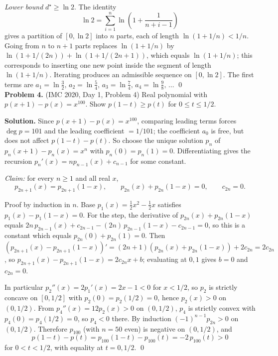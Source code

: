 \documentclass{article}
\begin{document}
\emph{Lower bound} \( d^{\star} \geq \ln 2 \). The identity
\[
\ln 2 = \sum_{i=1}^{n} \ln\!\left(1 + \frac{1}{n+i-1}\right)
\]
gives a partition of \( [0, \ln 2] \) into \( n \) parts, each of length \( \ln(1 + 1/n) < 1/n \). Going from \( n \) to \( n + 1 \) parts replaces \( \ln(1 + 1/n) \) by \( \ln(1 + 1/(2n)) + \ln(1 + 1/(2n+1)) \), which equals \( \ln(1 + 1/n) \); this corresponds to inserting one new point inside the segment of length \( \ln(1 + 1/n) \). Iterating produces an admissible sequence on \( [0, \ln 2] \). The first terms are \( a_1 = \ln \tfrac{3}{2},\, a_2 = \ln \tfrac{5}{4},\, a_3 = \ln \tfrac{7}{4},\, a_4 = \ln \tfrac{9}{8},\, \ldots \) \qed
\\

\textbf{Problem 4.} (IMC 2020, Day 1, Problem 4)
Real polynomial with \( p(x+1) - p(x) = x^{100} \). Show \( p(1-t) \geq p(t) \) for \( 0 \leq t \leq 1/2 \).

\textbf{Solution.}
Since \( p(x+1) - p(x) = x^{100} \), comparing leading terms forces \( \deg p = 101 \) and the leading coefficient \( = 1/101 \); the coefficient \( a_0 \) is free, but does not affect \( p(1-t) - p(t) \). So choose the unique solution \( p_n \) of \( p_n(x+1) - p_n(x) = x^n \) with \( p_n(0) = p_n(1) = 0 \). Differentiating gives the recursion \( p_n'(x) = n p_{n-1}(x) + c_{n-1} \) for some constant.

\emph{Claim:} for every \( n \geq 1 \) and all real \( x \),
\[
p_{2n+1}(x) = p_{2n+1}(1 - x), \qquad p_{2n}(x) + p_{2n}(1 - x) = 0, \qquad c_{2n} = 0.
\]

Proof by induction in \( n \). Base \( p_1(x) = \tfrac{1}{2}x^2 - \tfrac{1}{2}x \) satisfies \( p_1(x) - p_1(1-x) = 0 \). For the step, the derivative of \( p_{2n}(x) + p_{2n}(1-x) \) equals \( 2n\, p_{2n-1}(x) + c_{2n-1} - (2n)\,p_{2n-1}(1-x) - c_{2n-1} = 0 \), so this is a constant which equals \( p_{2n}(0) + p_{2n}(1) = 0 \). Then \( (p_{2n+1}(x) - p_{2n+1}(1-x))' = (2n+1)(p_{2n}(x) + p_{2n}(1-x)) + 2 c_{2n} = 2 c_{2n} \), so \( p_{2n+1}(x) - p_{2n+1}(1-x) = 2 c_{2n} x + b \); evaluating at \( 0, 1 \) gives \( b = 0 \) and \( c_{2n} = 0 \).

In particular \( p_2''(x) = 2 p_1'(x) = 2x - 1 < 0 \) for \( x < 1/2 \), so \( p_2 \) is strictly concave on \( [0, 1/2] \) with \( p_2(0) = p_2(1/2) = 0 \), hence \( p_2(x) > 0 \) on \( (0, 1/2) \). From \( p_4''(x) = 12 p_2(x) > 0 \) on \( (0, 1/2) \), \( p_4 \) is strictly convex with \( p_4(0) = p_4(1/2) = 0 \), so \( p_4 < 0 \) there. By induction \( (-1)^{n-1} p_{2n} > 0 \) on \( (0, 1/2) \). Therefore \( p_{100} \) (with \( n = 50 \) even) is negative on \( (0, 1/2) \), and
\[
p(1 - t) - p(t) = p_{100}(1 - t) - p_{100}(t) = -2\, p_{100}(t) > 0
\]
for \( 0 < t < 1/2 \), with equality at \( t = 0, 1/2 \). \qed
\\
\end{document}
